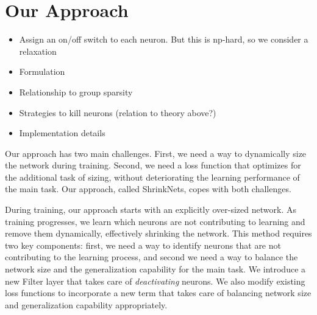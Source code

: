 \section{Our Approach}

\begin{itemize}
  \item Assign an on/off switch to each neuron. But this is np-hard, so we
  consider a relaxation
  \item Formulation
  \item Relationship to group sparsity
  \item Strategies to kill neurons (relation to theory above?)
  \item Implementation details
\end{itemize}

Our approach has two main challenges. First, we need a way to
dynamically size the network during training. Second, we need a
loss function that optimizes for the additional task of sizing, without
deteriorating the learning performance of the main task. Our
approach, called ShrinkNets, copes with both challenges.

During training, our approach starts
with an explicitly over-sized network. As training progresses, we learn
which neurons are not contributing to learning and remove them
dynamically, effectively shrinking the network. This method requires two key components: first, we need a way to identify neurons that are not contributing to the
learning process, and second we need a way to balance the network size and the
generalization capability for the main task. We introduce a new \textsf{Filter} 
layer that takes care of \emph{deactivating} neurons. We also modify
existing loss functions to incorporate a new term that takes care of balancing
network size and generalization capability appropriately.

